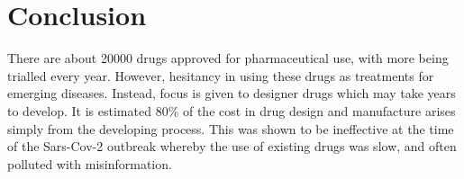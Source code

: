 \chapter{Conclusion}


\graphicspath{{Chapter6/Figs/Vector/}{Chapter6/Figs/}}




There are about 20000 drugs approved for pharmaceutical use, with more being trialled every year. However, hesitancy in using these drugs as treatments for emerging diseases. Instead, focus is given to designer drugs which may take years to develop. It is estimated 80\% of the cost in drug design and manufacture arises simply from the developing process. This was shown to be ineffective at the time of the Sars-Cov-2 outbreak whereby the use of existing drugs was slow, and often polluted with misinformation.